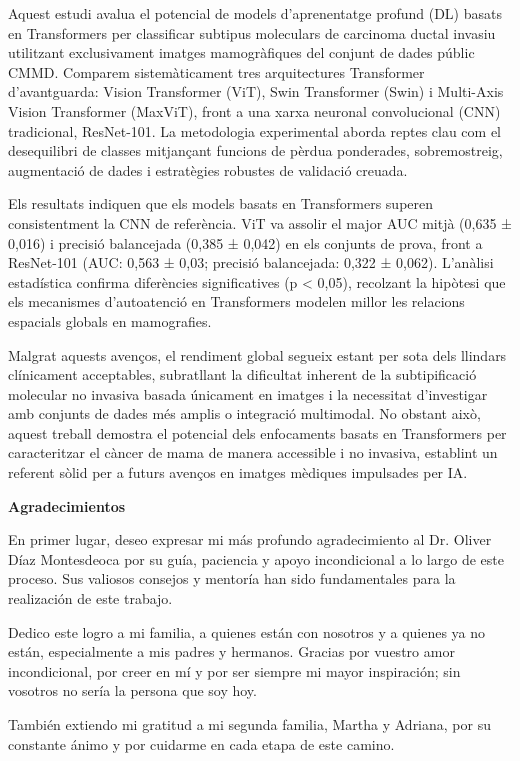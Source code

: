\documentclass[a4paper,10pt]{book}
\begin{document}
Aquest estudi avalua el potencial de models d'aprenentatge profund (DL) basats en Transformers per classificar subtipus moleculars de carcinoma ductal invasiu utilitzant exclusivament imatges mamogràfiques del conjunt de dades públic CMMD. Comparem sistemàticament tres arquitectures Transformer d'avantguarda: Vision Transformer (ViT), Swin Transformer (Swin) i Multi-Axis Vision Transformer (MaxViT), front a una xarxa neuronal convolucional (CNN) tradicional, ResNet-101. La metodologia experimental aborda reptes clau com el desequilibri de classes mitjançant funcions de pèrdua ponderades, sobremostreig, augmentació de dades i estratègies robustes de validació creuada.

Els resultats indiquen que els models basats en Transformers superen consistentment la CNN de referència. ViT va assolir el major AUC mitjà (0,635 ± 0,016) i precisió balancejada (0,385 ± 0,042) en els conjunts de prova, front a ResNet-101 (AUC: 0,563 ± 0,03; precisió balancejada: 0,322 ± 0,062). L'anàlisi estadística confirma diferències significatives (p < 0,05), recolzant la hipòtesi que els mecanismes d'autoatenció en Transformers modelen millor les relacions espacials globals en mamografies.

Malgrat aquests avenços, el rendiment global segueix estant per sota dels llindars clínicament acceptables, subratllant la dificultat inherent de la subtipificació molecular no invasiva basada únicament en imatges i la necessitat d'investigar amb conjunts de dades més amplis o integració multimodal. No obstant això, aquest treball demostra el potencial dels enfocaments basats en Transformers per caracteritzar el càncer de mama de manera accessible i no invasiva, establint un referent sòlid per a futurs avenços en imatges mèdiques impulsades per IA.

\newpage
{}
\noindent \textbf{\large Agradecimientos}

En primer lugar, deseo expresar mi más profundo agradecimiento al Dr. Oliver Díaz Montesdeoca por su guía, paciencia y apoyo incondicional a lo largo de este proceso. Sus valiosos consejos y mentoría han sido fundamentales para la realización de este trabajo.

Dedico este logro a mi familia, a quienes están con nosotros y a quienes ya no están, especialmente a mis padres y hermanos. Gracias por vuestro amor incondicional, por creer en mí y por ser siempre mi mayor inspiración; sin vosotros no sería la persona que soy hoy.

También extiendo mi gratitud a mi segunda familia, Martha y Adriana, por su constante ánimo y por cuidarme en cada etapa de este camino.
\end{document}
